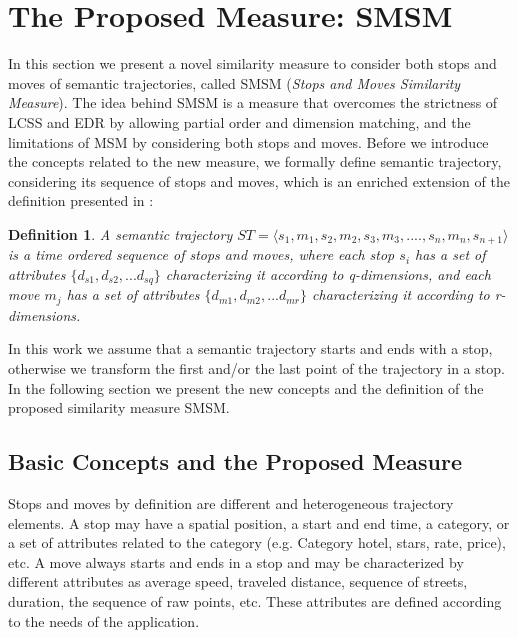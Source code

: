 \documentclass[12pt]{article}
\newtheorem{definition}{Definition}
\begin{document}


\section{The Proposed Measure: SMSM} \label{sec:proposed_measure}
In this section we present a novel similarity measure to consider both stops and moves of semantic trajectories, called SMSM (\textit{Stops and Moves Similarity Measure}). The idea behind SMSM is a measure that overcomes the strictness of LCSS and EDR by allowing partial order and dimension matching, and the limitations of MSM by considering both stops and moves. Before we introduce the concepts related to the new measure, we formally define semantic trajectory, considering its sequence of stops and moves, which is an enriched extension of the definition presented in \cite{Spaccapietra:2008:CVT:1347466.1347785}:


\begin{definition}
\label{def:semantic_trajectory}
A semantic trajectory  $ST=\langle s_1, m_1, s_2, m_2, s_3,m_3, ...., s_n, m_n, s_{n+1} \rangle$ is a time ordered sequence of stops and moves, where each stop $s_i$ has a set of attributes $\{d_{s1}, d_{s2}, ...d_{sq}\}$ characterizing it according to q-dimensions, and each move $m_j$  has a set of attributes $\{d_{m1}, d_{m2}, ...d_{mr}\}$  characterizing it according to r-dimensions. 
\end{definition}

In this work we assume that a semantic trajectory starts and ends with a stop, otherwise we transform the first and/or the last point of the trajectory in a stop. In the following section we present the new concepts and the definition of the proposed similarity measure SMSM.
\subsection{Basic Concepts and the Proposed Measure}

Stops and moves by definition are different and heterogeneous trajectory elements. A stop may have a spatial position, a start and end time, a category, or a set of attributes related to the category (e.g. Category hotel, stars, rate, price), etc. A move always starts and ends in a stop and may be characterized by different attributes as average speed, traveled distance, sequence of streets, duration, the sequence of raw points, etc. These attributes are defined according to the needs of the application. 
\end{document}
